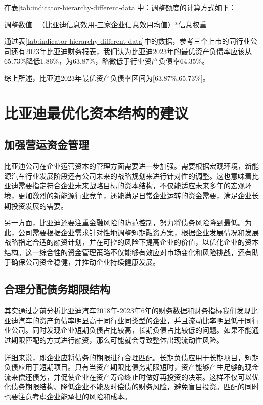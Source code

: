 在表\eqref{tab:indicator-hierarchy-different-data}中：调整额度的计算方式如下：

调整数值=（比亚迪信息效用-三家企业信息效用均值）*信息权重

通过表\eqref{tab:indicator-hierarchy-different-data}中的数据，参考三个上市的同行业公司还有2023年比亚迪财务报表，我们认为比亚迪2023年的最优资产负债率应该从65.73\%降低1.86\%，为63.87\%，略微低于行业资产负债率64.35\%。

综上所述，比亚迪2023年最优资产负债率区间为[63.87\%,65.73\%]。
\section{比亚迪最优化资本结构的建议}
\subsection{加强营运资金管理}
比亚迪公司在企业运营资本的管理方面需要进一步加强。需要根据宏观环境，新能源汽车行业发展阶段还有公司未来的战略规划来进行针对性的调整。这也意味着比亚迪需要指定符合企业未来战略目标的资本结构，不仅能适应未来多年的宏观环境，更加激烈的新能源行业竞争，还能满足日常企业运转的资金需要，满足企业长期投资发展的需要。  

另一方面，比亚迪还要注重金融风险的防范控制，努力将债务风险降到最低。为此，公司需要根据企业需求针对性地调整短期融资方案，根据企业发展情况和发展战略指定合适的融资计划，并在可控的风险下提高企业的价值，以优化企业的资本结构。这一综合性的资金管理策略不仅能够有效应对市场变化和风险挑战，还有助于确保公司资金稳健，并推动企业持续健康发展。
\subsection{合理分配债务期限结构}
其实通过之前分析比亚迪汽车2018年-2023年6年的财务数据和财务指标我们发现比亚迪汽车的资产负债率明显高于同行业同类型的企业，并且流动比率明显低于同行业公司。同时发现企业短期负债占比较高，长期负债占比较低的问题。如果不能通过期限匹配的方式进行融资，那么可能就会导致整体出现流动性风险。

详细来说，即企业应将债务的期限进行合理匹配。长期负债应用于长期项目，短期负债应用于短期项目。只有当资产期限比债务期限短时，资产能够产生足够的现金流来偿还债务，并促使企业在资产寿命终止时做好再投资的决策。这样不仅可以优化债务期限结构、降低企业不能及时偿债的财务风险，避免盲目投资。匹配的同时也要注意考虑企业能承担的风险和成本。
